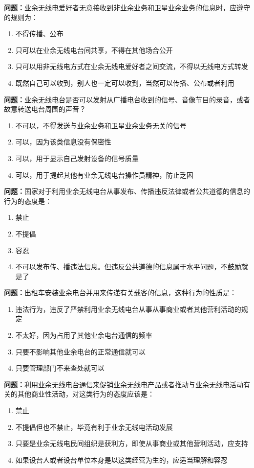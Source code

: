 \textbf{问题：}业余无线电爱好者无意接收到非业余业务和卫星业余业务的信息时，应遵守的规则为：
\begin{enumerate}[label=\Alph*), leftmargin=1cm]
	\item 不得传播、公布
	\item 只可以在业余无线电台间共享，不得在其他场合公开
	\item 只可以用非无线电方式在业余无线电爱好者之间交流，不得以无线电方式转发
	\item 既然自己可以收到，别人也一定可以收到，当然可以传播、公布或者利用
\end{enumerate}

\textbf{问题：}业余无线电台是否可以发射从广播电台收到的信号、音像节目的录音，或者故意转送电台周围的声音？
\begin{enumerate}[label=\Alph*), leftmargin=1cm]
	\item 不可以，不得发送与业余业务和卫星业余业务无关的信号
	\item 可以，因为该类信息没有保密性
	\item 可以，用于显示自己发射设备的信号质量
	\item 可以，用于提起其他有业余无线电台操作员精神，防止乏困
\end{enumerate}

\textbf{问题：}国家对于利用业余无线电台从事发布、传播违反法律或者公共道德的信息的行为的态度是：
\begin{enumerate}[label=\Alph*), leftmargin=1cm]
	\item 禁止
	\item 不提倡
	\item 容忍
	\item 不可以发布传、播违法信息。但违反公共道德的信息属于水平问题，不鼓励就是了
\end{enumerate}

\textbf{问题：}出租车安装业余电台并用来传递有关载客的信息，这种行为的性质是：
\begin{enumerate}[label=\Alph*), leftmargin=1cm]
	\item 违法行为，违反了严禁利用业余无线电台从事从事商业或者其他营利活动的规定
	\item 不太好，因为占用了其他业余电台通信的频率
	\item 只要不影响其他业余电台的正常通信就可以
	\item 只要管理部门不来查处就可以
\end{enumerate}

\textbf{问题：}利用业余无线电台通信来促销业余无线电产品或者推动与业余无线电活动有关的其他商业性活动，对这类行为的态度应该是：
\begin{enumerate}[label=\Alph*), leftmargin=1cm]
	\item 禁止
	\item 不提倡但也不禁止，毕竟有利于业余无线电活动发展
	\item 只要是业余无线电民间组织是获利方，即使从事商业或其他营利活动，应支持
	\item 如果设台人或者设台单位本身是以这类经营为生的，应适当理解和容忍
\end{enumerate}

